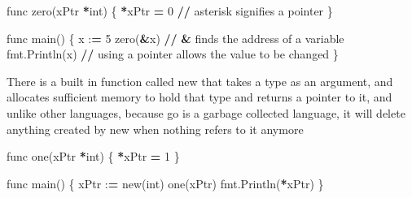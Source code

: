 \documentclass[]{book}
\newenvironment{Shaded}{\begin{snugshade}}{\end{snugshade}}
\newcommand{\BuiltInTok}[1]{#1}
\newcommand{\DecValTok}[1]{\textcolor[rgb]{0.00,0.00,0.81}{#1}}
\newcommand{\NormalTok}[1]{#1}
\newcommand{\OperatorTok}[1]{\textcolor[rgb]{0.81,0.36,0.00}{\textbf{#1}}}
\begin{document}
\begin{Shaded}
\begin{Highlighting}[]
\NormalTok{func zero(xPtr }\OperatorTok{*}\BuiltInTok{int}\NormalTok{) \{                                              }
    \OperatorTok{*}\NormalTok{xPtr }\OperatorTok{=} \DecValTok{0} \OperatorTok{//}\NormalTok{ asterisk signifies a pointer                                                       }
\NormalTok{\}                                                                   }
                                                                    
\NormalTok{func main() \{                                                       }
\NormalTok{    x :}\OperatorTok{=} \DecValTok{5}                                                          
\NormalTok{    zero(}\OperatorTok{&}\NormalTok{x) }\OperatorTok{//} \OperatorTok{&}\NormalTok{ finds the address of a variable                                                       }
\NormalTok{    fmt.Println(x) }\OperatorTok{//}\NormalTok{ using a pointer allows the value to be changed}
\NormalTok{\}                                                                   }
\end{Highlighting}
\end{Shaded}

There is a built in function called new that takes a type as an argument, and allocates sufficient memory to hold that type and returns a pointer to it, and unlike other languages, because go is a garbage collected language, it will delete anything created by new when nothing refers to it anymore

\begin{Shaded}
\begin{Highlighting}[]
\NormalTok{func one(xPtr }\OperatorTok{*}\BuiltInTok{int}\NormalTok{) \{}
    \OperatorTok{*}\NormalTok{xPtr }\OperatorTok{=} \DecValTok{1}        
\NormalTok{\}}
                    
\NormalTok{func main() \{                                                                                                                 }
\NormalTok{    xPtr :}\OperatorTok{=}\NormalTok{ new(}\BuiltInTok{int}\NormalTok{)                                                }
\NormalTok{    one(xPtr)                                                       }
\NormalTok{    fmt.Println(}\OperatorTok{*}\NormalTok{xPtr)                                              }
\NormalTok{\}                                                                   }
\end{Highlighting}
\end{Shaded}
\end{document}

